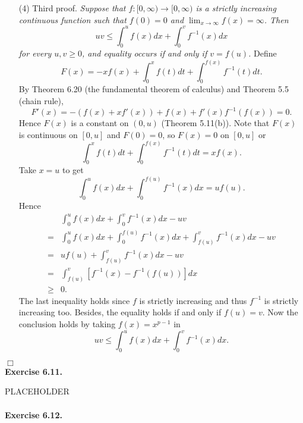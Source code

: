 \documentclass{article}
\begin{document}
\begin{enumerate}
  \item[(4)]
  Third proof.
  \emph{Suppose that $f:[0,\infty) \to [0,\infty)$ is a strictly increasing continuous function
  such that $f(0) = 0$ and $\lim_{x \to \infty} f(x) = \infty$.
  Then
  \[
    uv \leq \int_{0}^{u} f(x)dx + \int_{0}^{v} f^{-1}(x)dx
  \]
  for every $u,v \geq 0$, and equality occurs if and only if $v = f(u)$.}
  Define
  \[
    F(x) = -xf(x) + \int_{0}^{x} f(t)dt + \int_{0}^{f(x)} f^{-1}(t)dt.
  \]
  By Theorem 6.20 (the fundamental theorem of calculus) and Theorem 5.5 (chain rule),
  \[
    F'(x) = -(f(x) + xf'(x))+ f(x) + f'(x) f^{-1}(f(x)) = 0.
  \]
  Hence $F(x)$ is a constant on $(0,u)$ (Theorem 5.11(b)).
  Note that $F(x)$ is continuous on $[0,u]$ and $F(0) = 0$,
  so $F(x) = 0$ on $[0,u]$
  or
  \[
    \int_{0}^{x} f(t)dt + \int_{0}^{f(x)} f^{-1}(t)dt = xf(x).
  \]
  Take $x = u$ to get
  \[
    \int_{0}^{u} f(x)dx + \int_{0}^{f(u)} f^{-1}(x)dx = uf(u).
  \]
  Hence
  \begin{align*}
    &\int_{0}^{u} f(x)dx + \int_{0}^{v} f^{-1}(x)dx - uv \\
    =&
    \int_{0}^{u} f(x)dx + \int_{0}^{f(u)} f^{-1}(x)dx + \int_{f(u)}^{v} f^{-1}(x)dx - uv \\
    =&
    uf(u) + \int_{f(u)}^{v} f^{-1}(x)dx - uv \\
    =&
    \int_{f(u)}^{v} [ f^{-1}(x)-f^{-1}(f(u)) ] dx \\
    \geq&
    0.
  \end{align*}
  The last inequality holds since $f$ is strictly increasing
  and thus $f^{-1}$ is strictly increasing too.
  Besides, the equality holds if and only if $f(u) = v$.
  Now the conclusion holds by taking $f(x) = x^{p-1}$ in
  \[
    uv \leq \int_{0}^{u} f(x)dx + \int_{0}^{v} f^{-1}(x)dx.
  \]
\end{enumerate}
$\Box$ \\






\textbf{Exercise 6.11.}

PLACEHOLDER \\\\






\textbf{Exercise 6.12.}
\end{document}
